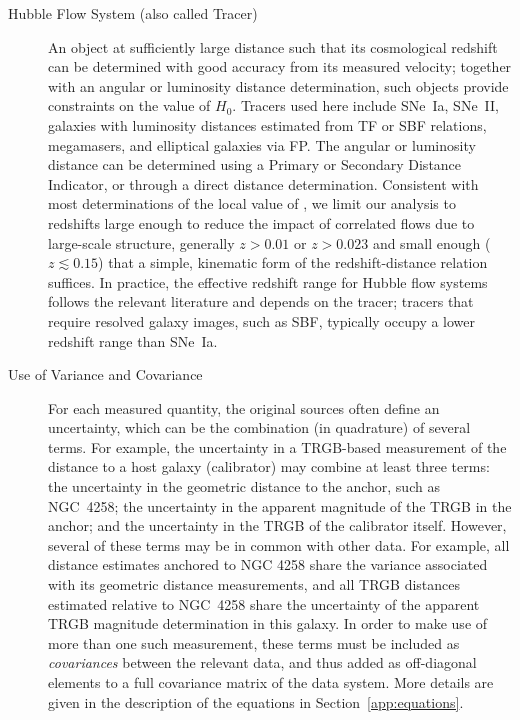 \begin {description}
\item [Hubble Flow System (also called Tracer)] An object at sufficiently large distance such that its cosmological redshift can be determined with good accuracy from its measured velocity; together with an angular or luminosity distance determination, such objects provide constraints on the value of $ H_0 $. Tracers used here include SNe~Ia, SNe~II, galaxies with luminosity distances estimated from TF or SBF relations, megamasers, and elliptical galaxies via FP.  The angular or luminosity distance can be determined using a Primary or Secondary Distance Indicator, or through a direct distance determination. Consistent with most determinations of the local value of {\Hcst}, we limit our analysis to redshifts large enough to reduce the impact of correlated flows due to large-scale structure, generally $z>0.01$ or $z>0.023$ and small enough ($ z \lesssim 0.15 $) that a simple, kinematic form of the redshift-distance relation suffices.  In practice, the effective redshift range for Hubble flow systems follows the relevant literature and depends on the tracer; tracers that require resolved galaxy images, such as SBF, typically occupy a lower redshift range than SNe~Ia.

\item [Use of Variance and Covariance] For each measured quantity, the original sources often define an uncertainty, which can be the combination (in quadrature) of several terms.  For example, the uncertainty in a TRGB-based measurement of the distance to a host galaxy (calibrator) may combine at least three terms: the uncertainty in the geometric distance to the anchor, such as NGC~4258; the uncertainty in the apparent magnitude of the TRGB in the anchor; and the uncertainty in the TRGB of the calibrator itself. However, several of these terms may be in common with other data. For example, all distance estimates anchored to NGC 4258 share the variance associated with its geometric distance measurements, and all TRGB distances estimated relative to NGC~4258 share the uncertainty of the apparent TRGB magnitude determination in this galaxy.
In order to make use of more than one such measurement, these terms must be included as \textit{covariances} between the relevant data, and thus added as off-diagonal elements to a full covariance matrix of the data system.  More details are given in the description of the equations in Section~\ref{app:equations}.


\end{description}
